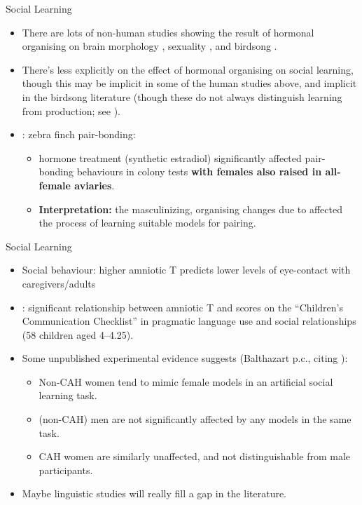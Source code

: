 \documentclass[hyperref={pdfpagelabels=false}]{beamer}
\begin{document}
\begin{frame}{Social Learning}
\begin{itemize}
	\item There are lots of non-human studies showing the result of hormonal organising on brain morphology \citep[e.g. in rats, going back to][]{gorski1978}, sexuality \citep[many references in][Chapts. 3-4]{balthazart2011}, and birdsong \citep[see][for an overview]{balthazartetal2009}.
	\item There's less explicitly on the effect of hormonal organising on social learning, though this may be implicit in some of the human studies above, and implicit in the birdsong literature (though these do not always distinguish learning from production; see \citealt{balthazartetal2009}).
	\item \citet{mansukhanietal1996}: zebra finch pair-bonding: 
		\begin{itemize}
		\item hormone treatment (synthetic estradiol) significantly affected pair-bonding behaviours in colony tests \textbf{with females also raised in all-female aviaries}.
		\item \textbf{Interpretation:} the masculinizing, organising changes due to affected the process of learning suitable models for pairing.
		\end{itemize}

\end{itemize}

\end{frame}

\begin{frame}{Social Learning}
\begin{itemize}

	\item Social behaviour: higher amniotic T predicts lower levels of eye-contact with caregivers/adults \citep{lutchmayaetal2002}
	\item \citet{knickmeyeretal2004}: significant relationship between amniotic T and scores on the ``Children's Communication Checklist'' in pragmatic language use and social relationships (58 children aged 4--4.25).
	\item Some unpublished experimental evidence suggests (Balthazart p.c., citing \citealt{hines2012}):
		\begin{itemize}
			\item Non-CAH women tend to mimic female models in an artificial social learning task.
			\item (non-CAH) men are not significantly affected by any models in the same task.
			\item CAH women are similarly unaffected, and not distinguishable from male participants.
		\end{itemize}
	\item Maybe linguistic studies will really fill a gap in the literature.
\end{itemize}

\end{frame}
\end{document}
